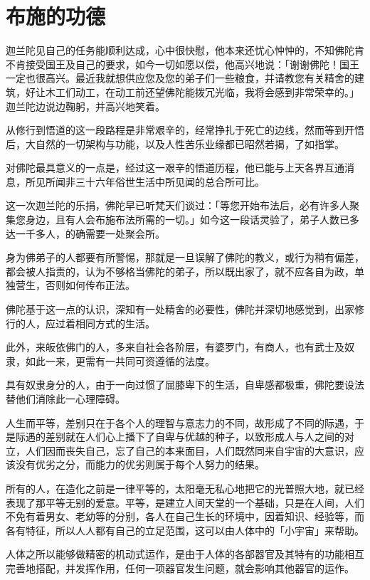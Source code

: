 \documentclass[twoside,openany]{book}
\begin{document}
\section{布施的功德}\label{sec3.12}

迦兰陀见自己的任务能顺利达成，心中很快慰，他本来还忧心忡忡的，不知佛陀肯不肯接受国王及自己的要求，如今一切如愿以偿，他高兴地说：「谢谢佛陀！国王一定也很高兴。最近我就想供应您及您的弟子们一些粮食，并请教您有关精舍的建筑，好让木工们动工，在动工前还望佛陀能拨冗光临，我将会感到非常荣幸的。」迦兰陀边说边鞠躬，并高兴地笑着。

从修行到悟道的这一段路程是非常艰辛的，经常挣扎于死亡的边线，然而等到开悟后，大自然的一切架构与功能，以及人性苦乐业缘都已昭然若揭，了如指掌。

对佛陀最具意义的一点是，经过这一艰辛的悟道历程，他已能与上天各界互通消息，所见所闻非三十六年俗世生活中所见闻的总合所可比。

这一次迦兰陀的乐捐，佛陀早已听梵天们谈过：「等您开始布法后，必有许多人聚集您身边，且有人会布施布法所需的一切。」如今这一段话灵验了，弟子人数已多达一千多人，的确需要一处聚会所。

身为佛弟子的人都要有所警惕，那就是一旦误解了佛陀的教义，或行为稍有偏差，都会被人指责的，认为不够格当佛陀的弟子，所以既出家了，就不应各自为政，单独营生，否则如何传布正法。

佛陀基于这一点的认识，深知有一处精舍的必要性，佛陀并深切地感觉到，出家修行的人，应过着相同方式的生活。

此外，来皈依佛门的人，多来自社会各阶层，有婆罗门，有商人，也有武士及奴隶，如此一来，更需有一共同可资遵循的法度。

具有奴隶身分的人，由于一向过惯了屈膝卑下的生活，自卑感都极重，佛陀要设法替他们消除此一心理障碍。

人生而平等，差别只在于各个人的理智与意志力的不同，故形成了不同的际遇，于是际遇的差别就在人们心上播下了自卑与优越的种子，以致形成人与人之间的对立，人们因而丧失自己，忘了自己的本来面目，人们既然同来自宇宙的大意识，应该没有优劣之分，而能力的优劣则属于每个人努力的结果。

所有的人，在造化之前是一律平等的，太阳毫无私心地把它的光普照大地，就已经表现了那平等无别的爱意。平等，是建立人间天堂的一个基础，只是在人间，人们不免有着男女、老幼等的分别，各人在自己生长的环境中，因着知识、经验等，而各有特征，所以人人都有自己的立足范围，这可以由人体中的「小宇宙」来帮助。

人体之所以能够做精密的机动式运作，是由于人体的各部器官及其特有的功能相互完善地搭配，并发挥作用，任何一项器官发生问题，就会影响其他器官的运作。
\end{document}
